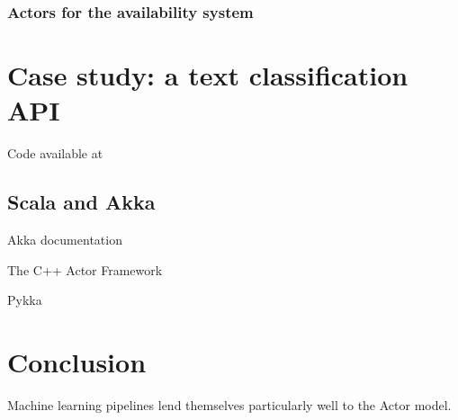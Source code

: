 \documentclass{article}
\begin{document}
\subsubsection{Actors for the availability system}

\section{Case study: a text classification API}

Code available at~\cite{gawalt_papis_demo}

\subsection{Scala and Akka}

Akka documentation~\cite{akka_doc}

The C++ Actor Framework~\cite{charousset2014caf}

Pykka~\cite{pykka_doc}

\section{Conclusion}

Machine learning pipelines lend themselves particularly well to the Actor model.




\end{document}
